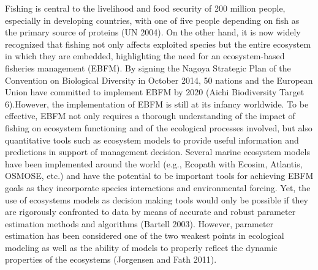 
Fishing is central to the livelihood and food security of 200 million people, especially in developing countries, with one of five people depending on fish as the primary source of proteins (UN 2004). On the other hand, it is now widely recognized that fishing not only affects exploited species but the entire ecosystem in which they are embedded, highlighting the need for an ecosystem-based fisheries management (EBFM). By signing the Nagoya Strategic Plan of the Convention on Biological Diversity in October 2014, 50 nations and the European Union have committed to implement EBFM by 2020 (Aichi Biodiversity Target 6).However, the implementation of EBFM is still at its infancy worldwide. To be effective, EBFM not only requires a thorough understanding of the impact of fishing on ecosystem functioning and of the ecological processes involved, but also quantitative tools such as ecosystem models to provide useful information and predictions in support of management decision. Several marine ecosystem models have been implemented around the world (e.g., Ecopath with Ecosim, Atlantis, OSMOSE, etc.) and have the potential to be important tools for achieving EBFM goals as they incorporate species interactions and environmental forcing. Yet, the use of ecosystems models as decision making tools would only be possible if they are rigorously confronted to data by means of accurate and robust parameter estimation methods and algorithms (Bartell 2003). However, parameter estimation has been considered one of the two weakest points in ecological modeling as well as the ability of models to properly reflect the dynamic properties of the ecosystems (Jorgensen and Fath 2011).  

